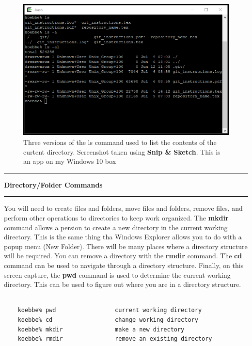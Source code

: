 \documentclass[10pt,fleqn]{article}
\begin{document}
\begin{figure}[h]
\centering
\includegraphics{../images/cygwin_02.png}
\caption{Three versions of the ls command used to list the contents of the
         curtent directory. Screenshot taken using {\bf Snip \& Sketch}. This is
         an app on my Windows 10 box}
\end{figure}
\eject
\vskip0.1in\hrule\vskip0.1in
\noindent
{\large{\bf Directory/Folder Commands}} 
\vskip0.1in\hrule\vskip0.1in
\noindent
You will need to create files and folders, move files and folders, remove files,
and perform other operations to directories to keep work organized. The
{\bf mkdir} command allows a persion to create a new directory in the current
working directory. This is the same thing tha Windows Explorer allows you to do
with a popup menu (New Folder). There will be many places where a directory
structure will be required. You can remove a directory with the {\bf rmdir}
command. The {\bf cd} command can be used to navigate through a directory
structure. Finally, on this screen capture, the {\bf pwd} command is used to
determine the current working directory. This can be used to figure out where
you are in a directory structure.
\begin{verbatim}

    koebbe% pwd                 current working directory
    koebbe% cd                  change working directory
    koebbe% mkdir               make a new directory
    koebbe% rmdir               remove an existing directory

\end{verbatim}
\end{document}
